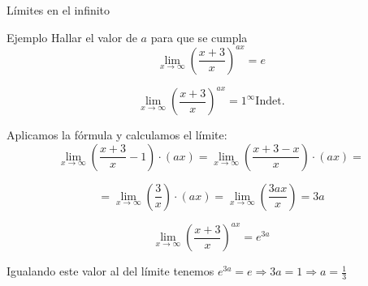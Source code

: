 \documentclass[8pt]{beamer}
\newcommand{\limite}[2]{\displaystyle \lim_{x \rightarrow #1}{#2}}
\begin{document}
\begin{frame}[t]{Límites en el infinito}
\begin{exampleblock}{Ejemplo}
Hallar el valor de $a$ para que se cumpla 
\[ \limite{\infty}{\left( \dfrac{x+3}{x}\right)^{ax}}= e \]
\end{exampleblock}
\[ \limite{\infty}{\left( \dfrac{x+3}{x}\right)^{ax}}= 1^{\infty} \text{Indet.} \]

Aplicamos la fórmula y calculamos el límite:
\[ \limite{\infty}{\left( \dfrac{x+3}{x}-1 \right)\cdot(ax)}= \limite{\infty}{\left( \dfrac{x+3-x}{x}\right)\cdot (ax)}= \]

\[= \limite{\infty}{\left( \dfrac{3}{x}\right)\cdot(ax)}= \limite{\infty}{\left( \dfrac{3ax}{x}\right)}= 3a \]

\[ \limite{\infty}{\left( \dfrac{x+3}{x}\right)^{ax}}=e^{3a} \]

Igualando este valor al del límite tenemos $e^{3a}=e \Rightarrow 3a= 1 \Rightarrow a=\frac{1}{3}$

\end{frame}
\end{document}
